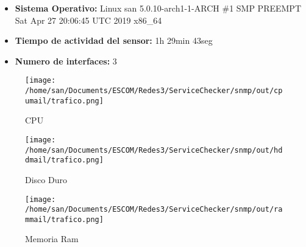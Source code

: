 \begin{itemize}
\item \textbf{Sistema Operativo:}  Linux san 5.0.10-arch1-1-ARCH \#1 SMP PREEMPT Sat Apr 27 20:06:45 UTC 2019 x86\_64
\item \textbf{Tiempo de actividad del sensor:} 1h 29min 43seg
\item \textbf{Numero de interfaces:} 3
\end{itemize}
\begin{figure}[!htb]
\texttt{[image: /home/san/Documents/ESCOM/Redes3/ServiceChecker/snmp/out/cpumail/trafico.png]}
\caption{CPU}\label{fig:awesome_image1}
\endminipage\hfill
{}
\texttt{[image: /home/san/Documents/ESCOM/Redes3/ServiceChecker/snmp/out/hddmail/trafico.png]}
\caption{Disco Duro}\label{fig:awesome_image2}
\endminipage\hfill
{}%
\texttt{[image: /home/san/Documents/ESCOM/Redes3/ServiceChecker/snmp/out/rammail/trafico.png]}
\caption{Memoria Ram}\label{fig:awesome_image3}
\endminipage
\end{figure}
\FloatBarrier
